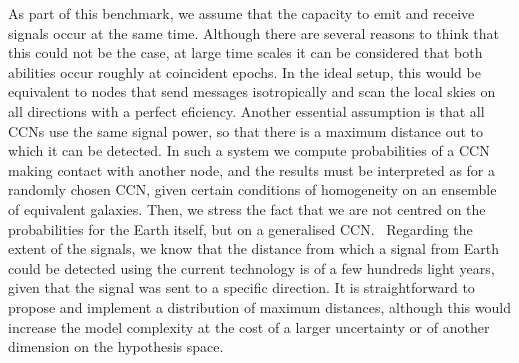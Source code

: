 \documentclass[crop]{CSLB}
\newcommand{\ceti}{CCN}
\newcommand{\cetis}{CCNs}
\begin{document}
As part of this benchmark, we assume that the capacity to emit and receive signals occur at the same time.
%
Although there are several reasons to think that this could not be the case, at large time scales it can be considered that both abilities occur roughly at coincident epochs.
%
In the ideal setup, this would be equivalent to nodes that send messages isotropically and scan the local skies on all directions with a perfect eficiency.
%
Another essential assumption is that all \cetis{} use the same signal power, so that there is a maximum distance out to which it can be detected.
%
%
In such a system we compute probabilities of a \ceti{} making contact with another node, and the results must be interpreted as for a randomly chosen \ceti{}, given certain conditions of homogeneity on an ensemble of equivalent galaxies.
%
Then, we stress the fact that we are not centred on the probabilities for the Earth itself, but on a generalised \ceti{}. 
%
Regarding the extent of the signals, we know that the distance from which a signal from Earth could be detected using the current technology is of a few hundreds light years, given that the signal was sent to a specific direction.
%
It is straightforward to propose and implement a distribution of maximum distances, although this would increase the model complexity at the cost of a larger uncertainty or of another dimension on the hypothesis space.    



%
%
\end{document}
